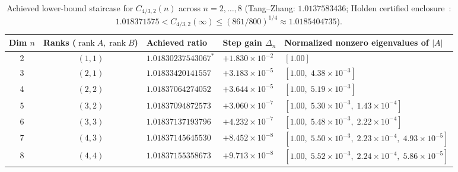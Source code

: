\documentclass[10pt,letterpaper]{article}
\newcommand{\rank}{\operatorname{rank}}
\begin{document}
\begin{table}[H]
\centering
\caption{\small Achieved lower-bound staircase for $C_{4/3,2}(n)$ across $n = 2,\dots,8$ (Tang--Zhang: $1.0137583436$; Holden certified enclosure~\cite{Holden2026b}: $1.018371575 < C_{4/3,2}(\infty) \le (861/800)^{1/4} \approx 1.0185404735$).}
\vspace{3pt}
\footnotesize
\begin{tabular}{@{}c c l l l@{}}
\toprule
\textbf{Dim $n$} & \textbf{Ranks ($\rank A, \rank B$)} & \textbf{Achieved ratio} & \textbf{Step gain $\Delta_n$} & \textbf{Normalized nonzero eigenvalues of $|A|$} \\
\midrule
2 & $(1,1)$ & $1.01830237543067^*$ & $+1.830\times 10^{-2}$ & $[1.00]$ \\
3 & $(2,1)$ & $1.01833420141557$   & $+3.183\times 10^{-5}$ & $[1.00,\; 4.38\times 10^{-3}]$ \\
4 & $(2,2)$ & $1.01837064274052$   & $+3.644\times 10^{-5}$ & $[1.00,\; 5.19\times 10^{-3}]$ \\
5 & $(3,2)$ & $1.01837094872573$   & $+3.060\times 10^{-7}$ & $[1.00,\; 5.30\times 10^{-3},\; 1.43\times 10^{-4}]$ \\
6 & $(3,3)$ & $1.01837137193796$   & $+4.232\times 10^{-7}$ & $[1.00,\; 5.48\times 10^{-3},\; 2.22\times 10^{-4}]$ \\
7 & $(4,3)$ & $1.01837145645530$   & $+8.452\times 10^{-8}$ & $[1.00,\; 5.50\times 10^{-3},\; 2.23\times 10^{-4},\; 4.93\times 10^{-5}]$ \\
8 & $(4,4)$ & $1.01837155358673$   & $+9.713\times 10^{-8}$ & $[1.00,\; 5.52\times 10^{-3},\; 2.24\times 10^{-4},\; 5.86\times 10^{-5}]$ \\
\bottomrule
\end{tabular}
\label{tab:p43}
\end{table}
\end{document}
